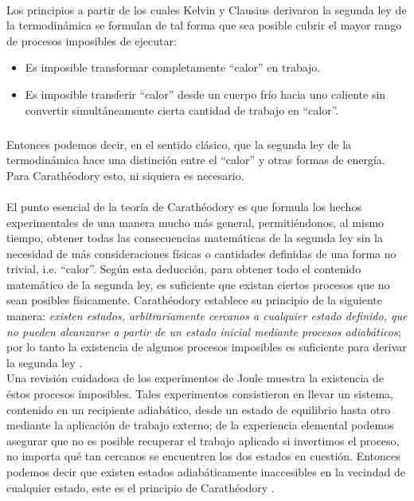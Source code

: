 \documentclass{article}
\theoremstyle{definition} \newtheorem{defi}{Definici\'on}
\theoremstyle{definition} \newtheorem{teo}{Teorema}
\theoremstyle{definition} \newtheorem{cor}{Corolario}
\begin{document}
\paragraph{}
Los principios a partir de los cuales Kelvin y Clausius derivaron la segunda ley de la termodin\'amica se formulan de tal forma que sea posible cubrir el mayor rango de procesos imposibles de ejecutar:
\begin{itemize}
\item Es imposible transformar completamente ``calor'' en trabajo.
\item Es imposible transferir ``calor'' desde un cuerpo fr\'io hacia uno caliente sin convertir simult\'aneamente cierta cantidad de trabajo en ``calor''. 
\end{itemize}
\subparagraph{}
Entonces podemos decir, en el sentido cl\'asico, que la segunda ley de la termodin\'amica hace una distinci\'on entre el ``calor'' y otras formas de energ\'ia. Para Carath\'eodory esto, ni siquiera es necesario.
\paragraph{}
El punto esencial de la teor\'ia de Carath\'eodory es que formula los hechos experimentales de una manera mucho m\'as general, permiti\'endonos, al mismo tiempo, obtener todas las consecuencias matem\'aticas de la segunda ley sin la necesidad de m\'as consideraciones f\'isicas o cantidades definidas de una forma no trivial, i.e. ``calor''. Seg\'un esta deducci\'on, para obtener todo el contenido matem\'atico de la segunda ley, es suficiente que existan ciertos procesos que no sean posibles f\'isicamente. Carath\'eodory establece su principio de la siguiente manera: \emph{existen estados, arbitrariamente cercanos a cualquier estado definido, que no pueden alcanzarse a partir de un estado inicial mediante procesos adiab\'aticos}; por lo tanto la existencia de algunos procesos imposibles es suficiente para derivar la segunda ley \cite{MB}.\\
Una revisi\'on cuidadosa de los experimentos de Joule muestra la existencia de \'estos procesos imposibles. Tales experimentos consistieron en llevar un sistema, contenido en un recipiente adiab\'atico, desde un estado de equilibrio hasta otro mediante la aplicaci\'on de trabajo externo; de la experiencia elemental podemos asegurar que no es posible recuperar el trabajo aplicado si invertimos el proceso, no importa qu\'e tan cercanos se encuentren los dos estados en cuesti\'on. Entonces podemos decir que existen estados adiab\'aticamente inaccesibles en la vecindad de cualquier estado, este es el principio de Carath\'eodory \cite{MB}.
\end{document}

